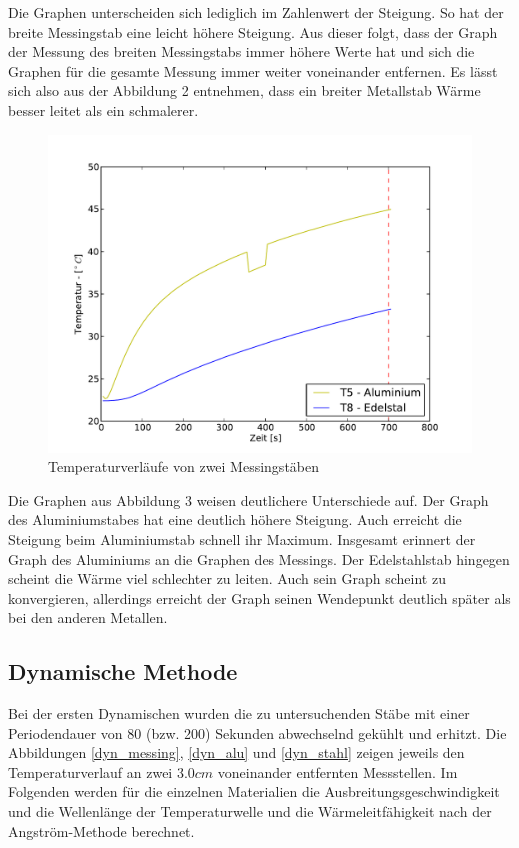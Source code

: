 \documentclass[11pt]{article}
\begin{document}
Die Graphen unterscheiden sich lediglich im Zahlenwert der Steigung. So hat der breite Messingstab eine leicht höhere Steigung. Aus dieser folgt, dass der Graph der Messung des breiten Messingstabs immer höhere Werte hat und sich die Graphen für die gesamte Messung immer weiter voneinander entfernen.
Es lässt sich also aus der Abbildung 2 entnehmen, dass ein breiter Metallstab Wärme besser leitet als ein schmalerer.
\begin{figure}[H]
\centering
\includegraphics[width = \textwidth]{Diagramme/Abb2.pdf}
\caption{Temperaturverläufe von zwei Messingstäben}
\label{T5T8}
\end{figure}
Die Graphen aus Abbildung 3 weisen deutlichere Unterschiede auf. Der Graph des Aluminiumstabes hat eine deutlich höhere Steigung. Auch erreicht die Steigung beim Aluminiumstab schnell ihr Maximum. Insgesamt erinnert der Graph des Aluminiums an die Graphen des Messings. Der Edelstahlstab hingegen scheint die Wärme viel schlechter zu leiten. Auch sein Graph scheint zu konvergieren, allerdings erreicht der Graph seinen Wendepunkt deutlich später als bei den anderen Metallen.

\subsection{Dynamische Methode}
Bei der ersten Dynamischen wurden die zu untersuchenden St\"abe mit einer Periodendauer von 80 (bzw. 200)  Sekunden abwechselnd gek\"uhlt und erhitzt. Die Abbildungen \ref{dyn_messing}, \ref{dyn_alu} und \ref{dyn_stahl} zeigen jeweils den Temperaturverlauf an zwei 3.0$cm$ voneinander entfernten Messstellen. Im Folgenden werden f\"ur die einzelnen Materialien die Ausbreitungsgeschwindigkeit und die Wellenl\"ange der Temperaturwelle und die W\"armeleitf\"ahigkeit nach der Angstr\"om-Methode berechnet.
\end{document}

